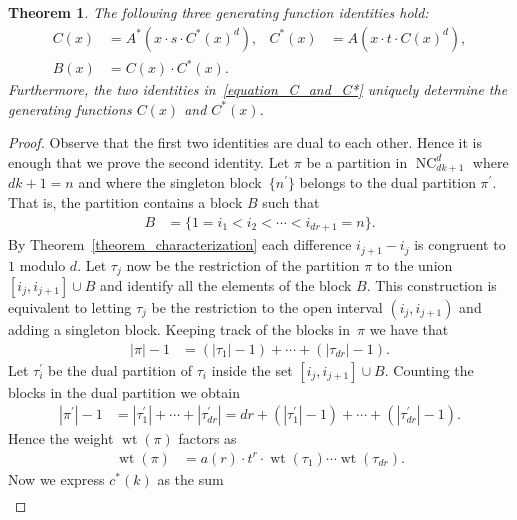 \documentclass[10pt,a4paper]{amsart}
\newtheorem{theorem}{Theorem}
\DeclareMathOperator{\NC}{NC}
\DeclareMathOperator{\wt}{wt}
\begin{document}
\begin{theorem}
The following three generating function identities hold:
\begin{align}
\label{equation_C_and_C*}
C(x)
& =
A^{*}\left(x \cdot s \cdot C^{*}(x)^{d}\right) ,
&
C^{*}(x)
& =
A\left(x \cdot t \cdot C(x)^{d}\right) , \\
B(x) & = C(x) \cdot C^{*}(x) .
\end{align}
Furthermore, the two identities in~\eqref{equation_C_and_C*} uniquely determine
the generating functions $C(x)$ and $C^{*}(x)$.
\label{theorem_generating_functions_C_and_C*}
\end{theorem}

\begin{proof}
Observe that the first two identities are dual to each other. Hence it
is enough 
that we prove the second identity.
Let $\pi$ be a partition in $\NC^{d}_{dk+1}$ where $dk+1 = n$
and where the singleton block~$\{n^{\prime}\}$
belongs to the dual partition $\pi^{\prime}$.
That is, the partition contains a block $B$ such that
\begin{align*}
B
& =
\{1 = i_{1} < i_{2} < \cdots < i_{dr+1} = n\} .
\end{align*}
By Theorem~\ref{theorem_characterization}
each difference $i_{j+1} - i_{j}$ is congruent to $1$ modulo $d$.
Let $\tau_{j}$ now be the restriction of the partition $\pi$
to the union $[i_{j},i_{j+1}] \cup B$ and identify all the elements of the block $B$.
This construction is equivalent to letting $\tau_{j}$ be the restriction to the
open interval $(i_{j},i_{j+1})$ and adding a singleton block.
Keeping track of the blocks in~$\pi$ we have that
\begin{align*}
|\pi| - 1
& =
(|\tau_{1}| - 1)
+ \cdots +
(|\tau_{dr}| - 1) .
\end{align*}
Let $\tau_{i}^{\prime}$ be the dual partition of $\tau_{i}$ inside the set $[i_{j},i_{j+1}] \cup B$.
Counting the blocks in the dual partition we obtain
\begin{align*}
|\pi^{\prime}| - 1
& =
|\tau^{\prime}_{1}|
+ \cdots +
|\tau^{\prime}_{dr}|
=
dr
+
(|\tau^{\prime}_{1}| - 1)
+ \cdots +
(|\tau^{\prime}_{dr}| - 1) .
\end{align*}
Hence the weight $\wt(\pi)$ factors as
\begin{align*}
\wt(\pi)
& =
a(r)
\cdot
t^{r}
\cdot
\wt(\tau_{1})
\cdots
\wt(\tau_{dr}) .
\end{align*}
Now we express $c^{*}(k)$ as the sum
\begin{align}
\label{equation_recursion_for_c*}

\end{align}
\end{proof}
\end{document}
